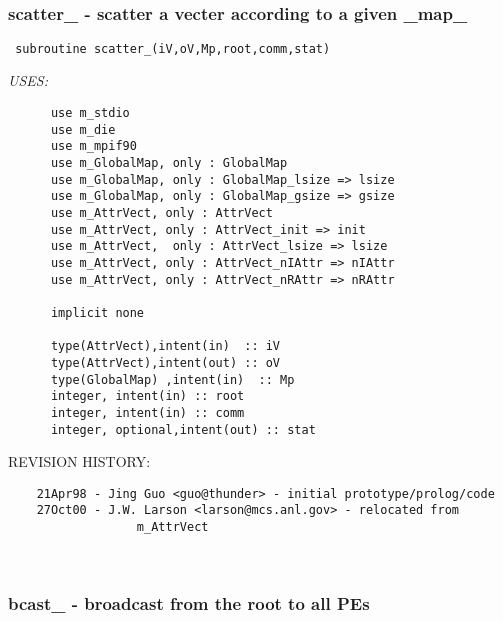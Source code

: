  
\mbox{}\hrulefill\ 
 

 \subsubsection{scatter\_ - scatter a vecter according to a given \_map\_}


 
 
\begin{verbatim} 
 subroutine scatter_(iV,oV,Mp,root,comm,stat)\end{verbatim}{\em USES:}
\begin{verbatim}      use m_stdio
      use m_die
      use m_mpif90
      use m_GlobalMap, only : GlobalMap
      use m_GlobalMap, only : GlobalMap_lsize => lsize
      use m_GlobalMap, only : GlobalMap_gsize => gsize
      use m_AttrVect, only : AttrVect
      use m_AttrVect, only : AttrVect_init => init
      use m_AttrVect,  only : AttrVect_lsize => lsize
      use m_AttrVect, only : AttrVect_nIAttr => nIAttr
      use m_AttrVect, only : AttrVect_nRAttr => nRAttr
 
      implicit none
 
      type(AttrVect),intent(in)  :: iV
      type(AttrVect),intent(out) :: oV
      type(GlobalMap) ,intent(in)  :: Mp
      integer, intent(in) :: root
      integer, intent(in) :: comm
      integer, optional,intent(out) :: stat
 \end{verbatim}{\sf REVISION HISTORY:}
\begin{verbatim}  	21Apr98 - Jing Guo <guo@thunder> - initial prototype/prolog/code
  	27Oct00 - J.W. Larson <larson@mcs.anl.gov> - relocated from
                  m_AttrVect\end{verbatim}
 
 
\mbox{}\hrulefill\ 
 

 \subsubsection{bcast\_ - broadcast from the root to all PEs}


 
 
